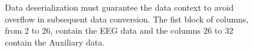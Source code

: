 
\begin{figure}[t]
\centering
{}

\centering
{}

\caption[OpenBCI Cyton data block deserialization]{Data deserialization must guarantee the data context to avoid overflow in subsequent data conversion. The fist block of columns, from 2 to 26, contain the EEG data and the columns 26 to 32 contain the Auxiliary data.}

\label{figure:deserialization}
\end{figure}

